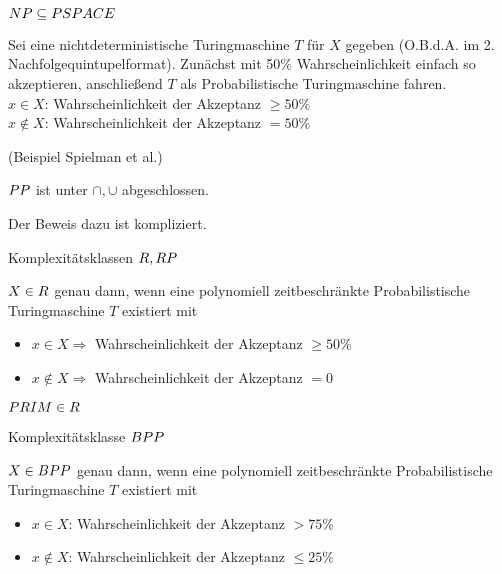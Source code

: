\begin{satz}
    $NP \subseteq PSPACE$
\end{satz}
\begin{beweis}
    Sei eine nichtdeterministische Turingmaschine $T$ für $X$ gegeben
    (O.B.d.A. im 2. Nachfolgequintupelformat).
    Zunächst mit 50\% Wahrscheinlichkeit einfach so akzeptieren,
    anschließend $T$ als Probabilistische Turingmaschine fahren.
    \\
    $x \in X$: Wahrscheinlichkeit der Akzeptanz $\geq 50\%$
    \\
    $x \notin X$: Wahrscheinlichkeit der Akzeptanz $= 50\%$
\end{beweis}

\begin{satz}
    (Beispiel Spielman et al.)

    $PP$ ist unter $\cap, \cup$ abgeschlossen.
\end{satz}
Der Beweis dazu ist kompliziert.



\begin{definition}
    Komplexitätsklassen $R, RP$

    $X \in R$ genau dann, wenn eine polynomiell zeitbeschränkte Probabilistische Turingmaschine $T$ existiert mit
    \begin{itemize}
        \item $x \in X \Rightarrow$ Wahrscheinlichkeit der Akzeptanz $\geq 50\%$
        \item $x \notin X \Rightarrow$ Wahrscheinlichkeit der Akzeptanz $= 0$
    \end{itemize}
\end{definition}

\begin{beispiel}
    $PRIM \in R$
\end{beispiel}


\begin{definition}
    Komplexitätsklasse $BPP$

    $X \in BPP$ genau dann, wenn eine polynomiell zeitbeschränkte Probabilistische Turingmaschine $T$ existiert mit
    \begin{itemize}
        \item $x \in X $: Wahrscheinlichkeit der Akzeptanz $> 75\%$
        \item $x \notin X $: Wahrscheinlichkeit der Akzeptanz $\leq 25\%$
    \end{itemize}
\end{definition}

